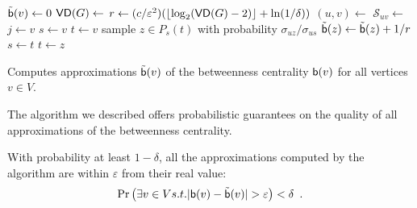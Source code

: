 \begin{algorithm}[h]
   \DontPrintSemicolon
  {
  $\tilde{\mathsf{b}}(v)\leftarrow 0$
  }
  $\mathsf{VD}(G)\leftarrow$\label{alg:diamcomp}\; 
  $r\leftarrow (c/\varepsilon^2)(\lfloor\log_2(\mathsf{VD}(G)-2)\rfloor+\ln(1/\delta))$\;
  {\label{algline:forloop}
  $(u,v)\leftarrow$\;
  $\mathcal{S}_{uv}\leftarrow$\label{algline:shortestpaths}\;
  {
  $j\leftarrow v$\;
  $s\leftarrow v$\;
  $t\leftarrow v$\;
   {
  sample $z\in P_s(t)$ with probability $\sigma_{uz}/\sigma_{us}$\;
   {
  $\tilde{\mathsf{b}}(z) \leftarrow \tilde{\mathsf{b}}(z)+1/r$\;
  $s\leftarrow t$\;
  $t\leftarrow z$\;
  }
  }
  }
  } %
  \caption{Computes approximations $\tilde{\mathsf{b}}(v)$ of the betweenness
  centrality $\mathsf{b}(v)$ for all vertices $v\in V$.}
  \label{alg:algorithm}
\end{algorithm}

The algorithm we described offers probabilistic guarantees on the quality of all
approximations of the betweenness centrality.
\begin{lemma}\label{lem:correctness}
  With probability at least $1-\delta$, all the approximations computed by the
  algorithm are within $\varepsilon$ from their real value:
  \[
  \Pr\left(\exists v\in V \mbox{ s.t. }
  |\betw(v)-\tilde\betw(v)|>\varepsilon\right)<\delta\enspace .
  \]
\end{lemma}

